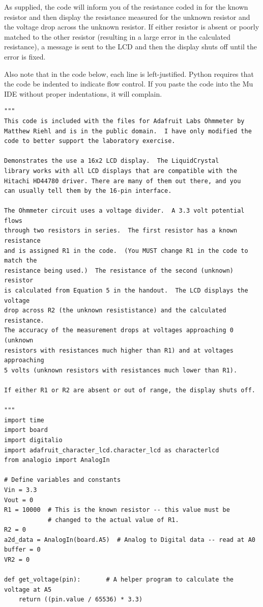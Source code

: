 \documentclass[]{article}
\begin{document}
	As supplied, the code will inform you of the resistance coded in for the known resistor and then display the resistance measured for the unknown resistor and the voltage drop across the unknown resistor.  If either resistor is absent or poorly matched to the other resistor (resulting in a large error in the calculated resistance), a message is sent to the LCD and then the display shuts off until the error is fixed.  

	Also note that in the code below, each line is left-justified.  Python requires that the code be indented to indicate flow control.  If you paste the code into the Mu IDE without proper indentations, it will complain.
\begin{verbatim}
"""
This code is included with the files for Adafruit Labs Ohmmeter by
Matthew Riehl and is in the public domain.  I have only modified the
code to better support the laboratory exercise.

Demonstrates the use a 16x2 LCD display.  The LiquidCrystal
library works with all LCD displays that are compatible with the
Hitachi HD44780 driver. There are many of them out there, and you
can usually tell them by the 16-pin interface.

The Ohmmeter circuit uses a voltage divider.  A 3.3 volt potential flows
through two resistors in series.  The first resistor has a known resistance
and is assigned R1 in the code.  (You MUST change R1 in the code to match the 
resistance being used.)  The resistance of the second (unknown) resistor
is calculated from Equation 5 in the handout.  The LCD displays the voltage
drop across R2 (the unknown resististance) and the calculated resistance.  
The accuracy of the measurement drops at voltages approaching 0 (unknown
resistors with resistances much higher than R1) and at voltages approaching
5 volts (unknown resistors with resistances much lower than R1).

If either R1 or R2 are absent or out of range, the display shuts off.

"""
import time
import board
import digitalio
import adafruit_character_lcd.character_lcd as characterlcd
from analogio import AnalogIn

# Define variables and constants
Vin = 3.3
Vout = 0
R1 = 10000  # This is the known resistor -- this value must be
            # changed to the actual value of R1.
R2 = 0
a2d_data = AnalogIn(board.A5)  # Analog to Digital data -- read at A0
buffer = 0
VR2 = 0

def get_voltage(pin):       # A helper program to calculate the voltage at A5
	return ((pin.value / 65536) * 3.3) 


\end{verbatim}
\end{document}
